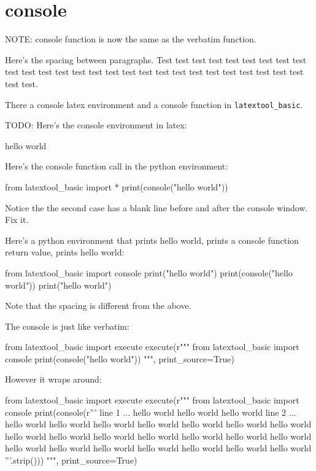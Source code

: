 \section{console}

NOTE: console function is now the same as the verbatim function.

Here's the spacing between paragraphs.
Test 
test test test test test test test test test test test test test test
test test test test test test test test test test test test test test.


There a console latex environment and a console function in 
\verb!latextool_basic!.
 
TODO:
Here's the console environment in latex:
\begin{console}
hello world
\end{console}
Here's the console function call in the python environment:
\begin{python}
from latextool_basic import *
print(console("hello world"))
\end{python}
Notice the the second case has a blank line before and after the console
window.
Fix it.

Here's a python environment that prints hello world, prints a console
function return value, prints hello world:
\begin{python}
from latextool_basic import console
print("hello world")
print(console("hello world"))
print("hello world")
\end{python}

Note that the spacing is different from the above.


The console is just like verbatim:
\begin{python}
from latextool_basic import execute
execute(r"""
from latextool_basic import console
print(console("hello world"))
""", print_source=True)
\end{python}


However it wraps around:
\begin{python}
from latextool_basic import execute
execute(r"""
from latextool_basic import console
print(console(r'''
line 1 ... hello world hello world hello world
line 2 ... hello world hello world hello world hello world hello world hello world hello world hello world hello world hello world hello world hello world hello world hello world hello world hello world hello world hello world hello world hello world hello world
'''.strip()))
""", print_source=True)
\end{python}

